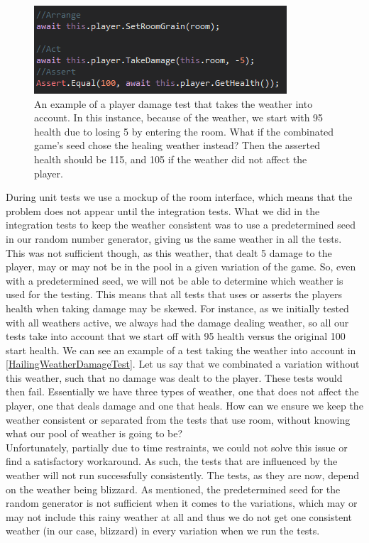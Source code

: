 \begin{figure}[h]
    \centering
    \includegraphics[width=0.5\linewidth]{Materials/TestingDiscussion/HailingWeatherDamageTest}
    \caption{An example of a player damage test that takes the weather into account. In this instance, because of the weather, we start with 95 health due to losing 5 by entering the room. What if the combinated game's seed chose the healing weather instead? Then the asserted health should be 115, and 105 if the weather did not affect the player.}
    \label{HailingWeatherDamageTest}
\end{figure}
During unit tests we use a mockup of the room interface, which means that the problem does not appear until the integration tests. What we did in the integration tests to keep the weather consistent was to use a predetermined seed in our random number generator, giving us the same weather in all the tests. This was not sufficient though, as this weather, that dealt 5 damage to the player, may or may not be in the pool in a given variation of the game. So, even with a predetermined seed, we will not be able to determine which weather is used for the testing. This means that all tests that uses or asserts the players health when taking damage may be skewed. For instance, as we initially tested with all weathers active, we always had the damage dealing weather, so all our tests take into account that we start off with 95 health versus the original 100 start health. We can see an example of a test taking the weather into account in \autoref{HailingWeatherDamageTest}. Let us say that we combinated a variation without this weather, such that no damage was dealt to the player. These tests would then fail. Essentially we have three types of weather, one that does not affect the player, one that deals damage and one that heals. How can we ensure we keep the weather consistent or separated from the tests that use room, without knowing what our pool of weather is going to be?  \\
Unfortunately, partially due to time restraints, we could not solve this issue or find a satisfactory workaround. As such, the tests that are influenced by the weather will not run successfully consistently. The tests, as they are now, depend on the weather being blizzard. As mentioned, the predetermined seed for the random generator is not sufficient when it comes to the variations, which may or may not include this rainy weather at all and thus we do not get one consistent weather (in our case, blizzard) in every variation when we run the tests.
